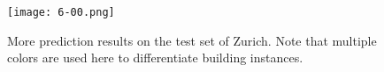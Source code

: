 \begin{figure}[!h]
	\centering
	\texttt{[image: 6-00.png]}
    \caption[More prediction results on the test set of Zurich]{More prediction results on the test set of Zurich. Note that multiple colors are used here to differentiate building instances.}
	\label{fig:finalzhmore}
\end{figure}